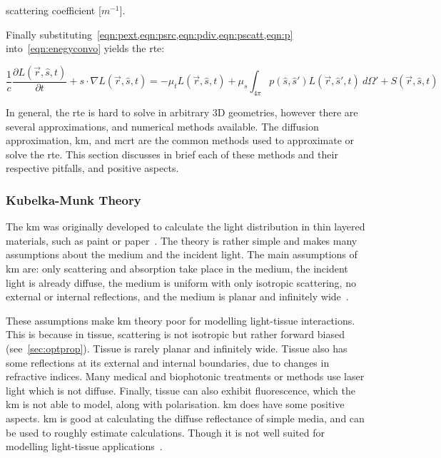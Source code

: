 \indent scattering coefficient [$m^{-1}$].

\medskip


Finally substituting~\cref{eqn:pext,eqn:psrc,eqn:pdiv,eqn:pscatt,eqn:p} into~\cref{eqn:enegyconvo} yields the \gls*{rte}:

\begin{equation}
\frac{1}{c}\frac{\partial L(\vec{r},\hat{s},t)}{\partial t} + s\cdot \nabla L(\vec{r},\hat{s},t)=-\mu_tL(\vec{r},\hat{s},t)+\mu_s\int_{4\pi}p(\hat{s},\hat{s}')L(\vec{r},\hat{s}',t)\ d\Omega' + S(\vec{r},\hat{s},t)
\label{eqn:rte}
\end{equation}


In general, the \gls*{rte} is hard to solve in arbitrary 3D geometries, however there are several approximations, and numerical methods available. The diffusion approximation, \gls*{km}, and \gls*{mcrt} are the common methods used to approximate or solve the \gls*{rte}.
This section discusses in brief each of these methods and their respective pitfalls, and positive aspects.

\subsubsection*{Kubelka-Munk Theory}
The \gls*{km} was originally developed to calculate the light distribution in thin layered materials, such as paint or paper~\cite{barbaric2011kubelka}. The theory is rather simple and makes many assumptions about the medium and the incident light. The main assumptions of \gls*{km} are: only scattering and absorption take place in the medium, the incident light is already diffuse, the medium is uniform with only isotropic scattering, no external or internal reflections, and the medium is planar and infinitely wide~\cite{jasinski2011modelling,cheong1990review,gabriela2013mathematical}.

These assumptions make \gls*{km} theory poor for modelling light-tissue interactions.
This is because in tissue, scattering is not isotropic but rather forward biased (see~\cref{sec:optprop}). 
Tissue is rarely planar and infinitely wide. 
Tissue also has some reflections at its external and internal boundaries, due to changes in refractive indices. 
Many medical and biophotonic treatments or methods use laser light which is not diffuse. Finally, tissue can also exhibit fluorescence, which the \gls*{km} is not able to model, along with polarisation. 
\gls*{km} does have some positive aspects.
\Gls*{km} is good at calculating the diffuse reflectance of simple media, and can be used to roughly estimate calculations. Though it is not well suited for modelling light-tissue applications~\cite{prahl1990light}.

